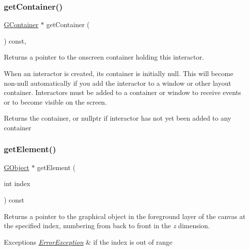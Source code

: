 \subsubsection{\texorpdfstring{get\+Container()}{getContainer()}}
{\footnotesize\ttfamily \mbox{\hyperlink{classGContainer}{G\+Container}} $\ast$ get\+Container (\begin{DoxyParamCaption}{ }\end{DoxyParamCaption}) const\hspace{0.3cm}{\ttfamily [virtual]}, {\ttfamily [inherited]}}



Returns a pointer to the onscreen container holding this interactor. 

When an interactor is created, its container is initially null. This will become non-\/null automatically if you add the interactor to a window or other layout container. Interactors must be added to a container or window to receive events or to become visible on the screen. \begin{DoxyReturn}{Returns}
the container, or nullptr if interactor has not yet been added to any container 
\end{DoxyReturn}
\mbox{\label{classGCanvas_abde388cc529d22bb5f7f4a54d56049d8}} 
\subsubsection{\texorpdfstring{get\+Element()}{getElement()}}
{\footnotesize\ttfamily \mbox{\hyperlink{classGObject}{G\+Object}} $\ast$ get\+Element (\begin{DoxyParamCaption}\item[{int}]{index }\end{DoxyParamCaption}) const\hspace{0.3cm}{\ttfamily [virtual]}}



Returns a pointer to the graphical object in the foreground layer of the canvas at the specified index, numbering from back to front in the {\itshape z} dimension. 


\begin{DoxyExceptions}{Exceptions}
{\em \mbox{\hyperlink{classErrorException}{Error\+Exception}}} & if the index is out of range \\
\hline
\end{DoxyExceptions}
\mbox{\label{classGCanvas_a25efa999eca5790ec26ef091b05f961c}} 

